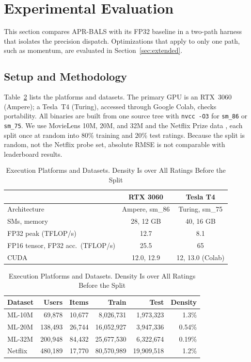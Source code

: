 \section{Experimental Evaluation}
\label{sec:eval}

This section compares APR-BALS with its FP32 baseline in a two-path harness that isolates the precision dispatch. Optimizations that apply to only one path, such as momentum, are evaluated in Section~\ref{sec:extended}.

\subsection{Setup and Methodology}
\label{ssec:setup}

Table~\ref{tab:platforms} lists the platforms and datasets. The primary GPU is an RTX~3060 (Ampere); a Tesla~T4 (Turing), accessed through Google Colab, checks portability. All binaries are built from one source tree with \texttt{nvcc -O3} for \texttt{sm\_86} or \texttt{sm\_75}. We use MovieLens 10M, 20M, and 32M \cite{harper2016movielens} and the Netflix Prize data \cite{bennett2007netflix}, each split once at random into 80\% training and 20\% test ratings. Because the split is random, not the Netflix probe set, absolute RMSE is not comparable with leaderboard results.

\begin{table}[!t]
\caption{Execution Platforms and Datasets. Density Is over All Ratings Before the Split}
\label{tab:platforms}
\centering
\footnotesize
\renewcommand{\arraystretch}{1.05}
\setlength{\tabcolsep}{3pt}
\begin{tabular}{lcc}
\toprule
 & \textbf{RTX 3060} & \textbf{Tesla T4} \\
\midrule
Architecture & Ampere, sm\_86 & Turing, sm\_75 \\
SMs, memory & 28, 12 GB & 40, 16 GB \\
FP32 peak (TFLOP/s) & 12.7 & 8.1 \\
FP16 tensor, FP32 acc.\ (TFLOP/s) & 25.5 & 65 \\
CUDA & 12.0, 12.9 & 12, 13.0 (Colab) \\
\bottomrule
\end{tabular}

\vspace{4pt}

\setlength{\tabcolsep}{2.5pt}
\begin{tabular}{lrrrrr}
\toprule
\textbf{Dataset} & \textbf{Users} & \textbf{Items} & \textbf{Train} & \textbf{Test} & \textbf{Density} \\
\midrule
ML-10M   & 69{,}878  & 10{,}677 & 8{,}026{,}731  & 1{,}973{,}323 & 1.3\% \\
ML-20M   & 138{,}493 & 26{,}744 & 16{,}052{,}927 & 3{,}947{,}336 & 0.54\% \\
ML-32M   & 200{,}948 & 84{,}432 & 25{,}677{,}530 & 6{,}322{,}674 & 0.19\% \\
Netflix  & 480{,}189 & 17{,}770 & 80{,}570{,}989 & 19{,}909{,}518 & 1.2\% \\
\bottomrule
\end{tabular}
\end{table}

